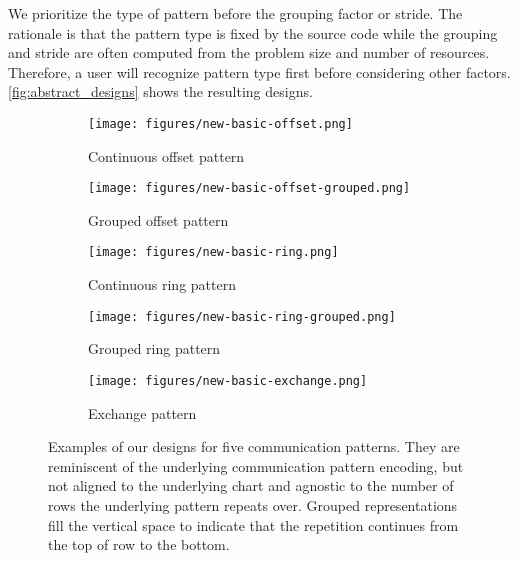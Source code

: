 We prioritize the type of pattern before the grouping factor or stride. The rationale is that the pattern type is fixed by the source code while the grouping and stride are often computed from the problem size and number of resources. Therefore, a user will recognize pattern type first before considering other factors. \autoref{fig:abstract_designs} shows the resulting designs.


\begin{figure*}
    \centering
    \begin{subfigure}{0.18\textwidth}
         \centering
         \texttt{[image: figures/new-basic-offset.png]}
         \caption{Continuous offset pattern}
         \label{fig:noc}
    \end{subfigure}
    \begin{subfigure}{0.18\textwidth}
         \centering
         \texttt{[image: figures/new-basic-offset-grouped.png]}
         \caption{Grouped offset pattern}
         \label{fig:nog}
    \end{subfigure}
    \begin{subfigure}{0.18\textwidth}
         \centering
         \texttt{[image: figures/new-basic-ring.png]}
         \caption{Continuous ring pattern}
         \label{fig:nrc}
    \end{subfigure}
    \begin{subfigure}{0.18\textwidth}
         \centering
         \texttt{[image: figures/new-basic-ring-grouped.png]}
         \caption{Grouped ring pattern}
         \label{fig:nrg}
    \end{subfigure}
    \begin{subfigure}{0.18\textwidth}
         \centering
         \texttt{[image: figures/new-basic-exchange.png]}
         \caption{Exchange pattern}
         \label{fig:neg}
    \end{subfigure}
    \caption{Examples of our designs for five communication patterns. They are reminiscent of the underlying communication pattern encoding, but not aligned to the underlying chart and agnostic to the number of rows the underlying pattern repeats over. 
    Grouped representations fill the vertical space to indicate that the repetition continues from the top of row to the bottom.}
    \label{fig:abstract_designs}
\end{figure*}

